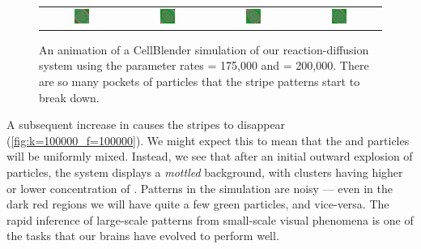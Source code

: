 \begin{figure}[h]
\begin{tabular}{c c c c}
\includegraphics[width = 0.2\textwidth]{../images/predator_prey_11_by_11_f_1.75_k_2_new_i4.png} & \includegraphics[width = 0.2\textwidth]{../images/../images/predator_prey_11_by_11_f_1.75_k_2_new_i5.png} & \includegraphics[width = 0.2\textwidth]{../images/../images/predator_prey_11_by_11_f_1.75_k_2_new_i6.png} & \includegraphics[width = 0.2\textwidth]{../images/../images/predator_prey_11_by_11_f_1.75_k_2_new_i7.png}
\end{tabular}
\caption{An animation of a CellBlender simulation of our reaction-diffusion system using the parameter rates  = 175,000 and  = 200,000. There are so many pockets of  particles that the stripe patterns start to break down.}
\label{fig:k=200000_f=175000}
\end{figure}

A subsequent increase in  causes the stripes to disappear (\autoref{fig:k=100000_f=100000}). We might expect this to mean that the  and  particles will be uniformly mixed. Instead, we see that after an initial outward explosion of  particles, the system displays a \textit{mottled} background, with clusters having higher or lower concentration of . Patterns in the simulation are noisy --- even in the dark red regions we will have quite a few green particles, and vice-versa. The rapid inference of large-scale patterns from small-scale visual phenomena is one of the tasks that our brains have evolved to perform well.

